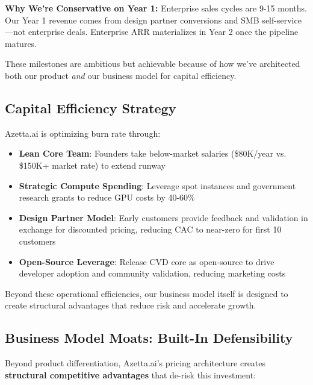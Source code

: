 \textbf{Why We're Conservative on Year 1:} Enterprise sales cycles are 9-15 months. Our Year 1 revenue comes from design partner conversions and SMB self-service—not enterprise deals. Enterprise ARR materializes in Year 2 once the pipeline matures.

\vspace{0.3cm}

These milestones are ambitious but achievable because of how we've architected both our product \textit{and} our business model for capital efficiency.

\subsection{Capital Efficiency Strategy}

Azetta.ai is optimizing burn rate through:

\begin{itemize}[noitemsep]
    \item \textbf{Lean Core Team}: Founders take below-market salaries (\$80K/year vs. \$150K+ market rate) to extend runway
    
    \item \textbf{Strategic Compute Spending}: Leverage spot instances and government research grants to reduce GPU costs by 40-60\%
    
    \item \textbf{Design Partner Model}: Early customers provide feedback and validation in exchange for discounted pricing, reducing CAC to near-zero for first 10 customers
    
    \item \textbf{Open-Source Leverage}: Release CVD core as open-source to drive developer adoption and community validation, reducing marketing costs
\end{itemize}

\vspace{0.3cm}

Beyond these operational efficiencies, our business model itself is designed to create structural advantages that reduce risk and accelerate growth.

\subsection{Business Model Moats: Built-In Defensibility}

Beyond product differentiation, Azetta.ai's pricing architecture creates \textbf{structural competitive advantages} that de-risk this investment:

